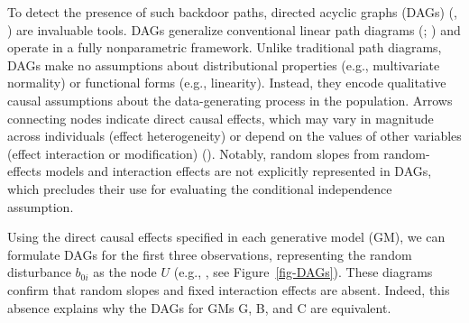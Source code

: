 \documentclass[
  11pt,
  a4paper,
]{article}
\begin{document}
To detect the presence of such backdoor paths, directed acyclic graphs
(DAGs) (,
) are invaluable tools. DAGs generalize
conventional linear path diagrams (; ) and operate in a fully
nonparametric framework. Unlike traditional path diagrams, DAGs make no
assumptions about distributional properties (e.g., multivariate
normality) or functional forms (e.g., linearity). Instead, they encode
qualitative causal assumptions about the data-generating process in the
population. Arrows connecting nodes indicate direct causal effects,
which may vary in magnitude across individuals (effect heterogeneity) or
depend on the values of other variables (effect interaction or
modification) ().
Notably, random slopes from random-effects models and interaction
effects are not explicitly represented in DAGs, which precludes their
use for evaluating the conditional independence assumption.

Using the direct causal effects specified in each generative model (GM),
we can formulate DAGs for the first three observations, representing the
random disturbance \(b_{0i}\) as the node \(U\) (e.g.,
, see
Figure~\ref{fig-DAGs}). These diagrams confirm that random slopes and
fixed interaction effects are absent. Indeed, this absence explains why
the DAGs for GMs G, B, and C are equivalent.
\end{document}
